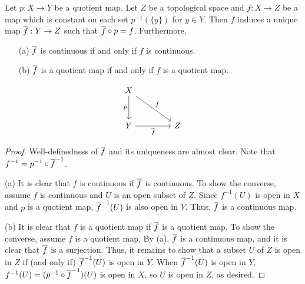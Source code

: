 \begin{thm}
    Let $p: X\rightarrow Y$ be a quotient map.
    Let $Z$ be a topological space and $f: X\rightarrow Z$ be a map which is constant on each set $p^{-1}(\{y\})$ for $y\in Y$.
    Then $f$ induces a unique map $\overline{f}: Y\rightarrow Z$ such that $\overline{f}\circ p=f$.
    Furthermore,
    \begin{enumerate}
        \item[(a)]
        {
            $\overline{f}$ is continuous if and only if $f$ is continuous.
        }
        \item[(b)]
        {
            $\overline{f}$ is a quotient map if and only if $f$ is a quotient map.
        }
    \end{enumerate}
    \begin{equation*}
    \begin{tikzcd}[row sep=1.0cm, column sep=1.5cm]
        X
        \arrow[d, "p"']
        \arrow[dr, "f"]
        &\\
        Y\arrow[r, "\ol{f}"']
        &
        Z
    \end{tikzcd}
    \end{equation*}
\end{thm}
\begin{proof}
    Well-definedness of $\overline{f}$ and its uniqueness are almost clear.
    Note that $f^{-1}=p^{-1}\circ\overline{f}^{-1}$.

    \hangindent=0.65cm
    \noindent(a)
    It is clear that $f$ is continuous if $\overline{f}$ is continuous.
    To show the converse, assume $f$ is continuous and $U$ is an open subset of $Z$.
    Since $f^{-1}(U)$ is open in $X$ and $p$ is a quotient map, $\overline{f}^{-1}(U)$ is also open in $Y$.
    Thus, $\overline{f}$ is a continuous map.

    \noindent(b)
    It is clear that $f$ is a quotient map if $\overline{f}$ is a quotient map.
    To show the converse, assume $f$ is a quotient map.
    By (a), $\overline{f}$ is a continuous map, and it is clear that $\overline{f}$ is a surjection.
    Thus, it remains to show that a subset $U$ of $Z$ is open in $Z$ if (and only if) $\overline{f}^{-1}(U)$ is open in $Y$.
    When $\overline{f}^{-1}(U)$ is open in $Y$, $f^{-1}(U)=(p^{-1}\circ\overline{f}^{-1})(U)$ is open in $X$, so $U$ is open in $Z$, as desired.
\end{proof}

